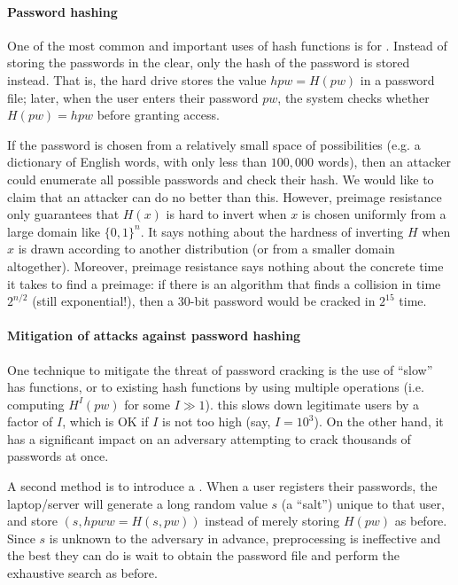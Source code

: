 \documentclass[a4paper, 11pt, openany]{book}
\begin{document}
\paragraph{Password hashing}

One of the most common and important uses of hash functions is for . Instead of storing the passwords in the clear, only the hash of the password is stored instead. That is, the hard drive stores the value $hpw = H(pw)$ in a password file; later, when the user enters their password $pw$, the system checks whether $H(pw) = hpw$ before granting access.

If the password is chosen from a relatively small space of possibilities (e.g. a dictionary of English words, with only less than $100,000$ words), then an attacker could enumerate all possible passwords and check their hash. We would like to claim that an attacker can do no better than this. However, preimage resistance only guarantees that $H(x)$ is hard to invert when $x$ is chosen uniformly from a large domain like $\{0,1\}^n$. It says nothing about the hardness of inverting $H$ when $x$ is drawn according to another distribution (or from a smaller domain altogether). Moreover, preimage resistance says nothing about the concrete time it takes to find a preimage: if there is an algorithm that finds a collision in time $2^{n/2}$ (still exponential!), then a 30-bit password would be cracked in $2^{15}$ time.

\paragraph{Mitigation of attacks against password hashing}
One technique to mitigate the threat of password cracking is the use of ``slow'' has functions, or to  existing hash functions by using multiple operations (i.e. computing $H^I(pw)$ for some $I \gg 1$). this slows down legitimate users by a factor of $I$, which is OK if $I$ is not too high (say, $I = 10^3$). On the other hand, it has a significant impact on an adversary attempting to crack thousands of passwords at once.

A second method is to introduce a . When a user registers their passwords, the laptop/server will generate a long random value $s$ (a ``salt'') unique to that user, and store $(s, hpww = H(s, pw))$ instead of merely storing $H(pw)$ as before. Since $s$ is unknown to the adversary in advance, preprocessing is ineffective and the best they can do is wait to obtain the password file and perform the exhaustive search as before.
\end{document}
